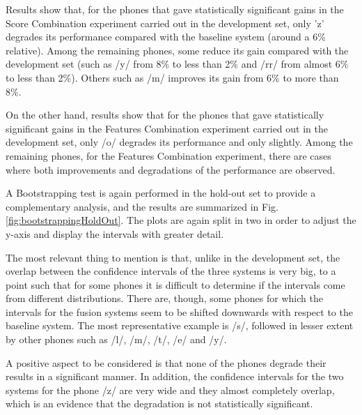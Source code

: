 Results show that, for the phones that gave statistically significant gains
in the Score Combination
experiment carried out in the development set, only 'z' degrades its performance compared
with the baseline system (around a 6\% relative). Among the
remaining phones, some reduce its gain compared with the development set (such as
/y/ from 8\% to less than 2\% and /rr/ from almost 6\% to less than 2\%). Others such
as /m/ improves its gain from 6\% to more than 8\%.

On the other hand, results show that
for the phones that gave statistically significant gains in the
Features Combination experiment carried out in the development set, only /o/ degrades
its performance and only slightly.
Among the remaining phones, for the Features Combination experiment,
there are cases where both improvements
and degradations of the performance are observed.

A Bootstrapping test is again performed in the hold-out set to provide a complementary analysis,
and the results are summarized in Fig. \ref{fig:bootstrappingHoldOut}.
The plots are again split in two in order to adjust the y-axis and display the intervals
with greater detail.

The most relevant thing to mention is that, unlike in the development set, the overlap
between the confidence intervals of the three systems is very big, to a point such that
for some phones it is difficult to determine if the intervals come from different
distributions. There are, though, some phones for which the intervals
for the fusion systems seem to be
shifted downwards with respect to the baseline system. The most representative example
is /s/, followed in lesser extent by other phones such as /l/, /m/, /t/, /e/ and /y/.

A positive aspect to be considered is that none of the phones degrade their
results in a significant manner. In addition,
the confidence intervals
for the two systems for the phone /z/ are very wide and they almost completely overlap,
which is an evidence that the degradation is not statistically significant.



